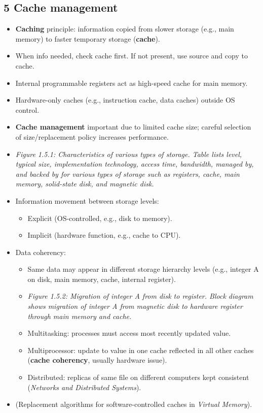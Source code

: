 \documentclass{article}
\begin{document}
\subsection*{5 Cache management}
\begin{itemize}
    \item \textbf{Caching} principle: information copied from slower storage (e.g., main memory) to faster temporary storage (\textbf{cache}).
    \item When info needed, check cache first. If not present, use source and copy to cache.
    \item Internal programmable registers act as high-speed cache for main memory.
    \item Hardware-only caches (e.g., instruction cache, data caches) outside OS control.
    \item \textbf{Cache management} important due to limited cache size; careful selection of size/replacement policy increases performance.
    \item \textit{Figure 1.5.1: Characteristics of various types of storage. Table lists level, typical size, implementation technology, access time, bandwidth, managed by, and backed by for various types of storage such as registers, cache, main memory, solid-state disk, and magnetic disk.}
    \item Information movement between storage levels:
    \begin{itemize}
        \item Explicit (OS-controlled, e.g., disk to memory).
        \item Implicit (hardware function, e.g., cache to CPU).
    \end{itemize}
    \item Data coherency:
    \begin{itemize}
        \item Same data may appear in different storage hierarchy levels (e.g., integer A on disk, main memory, cache, internal register).
        \item \textit{Figure 1.5.2: Migration of integer A from disk to register. Block diagram shows migration of integer A from magnetic disk to hardware register through main memory and cache.}
        \item Multitasking: processes must access most recently updated value.
        \item Multiprocessor: update to value in one cache reflected in all other caches (\textbf{cache coherency}, usually hardware issue).
        \item Distributed: replicas of same file on different computers kept consistent (\textit{Networks and Distributed Systems}).
    \end{itemize}
    \item (Replacement algorithms for software-controlled caches in \textit{Virtual Memory}).
\end{itemize}
\end{document}
